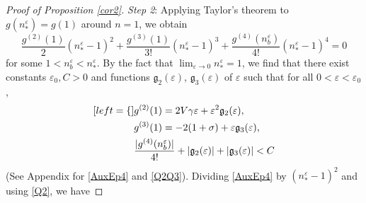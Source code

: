 \documentclass{amsart}
\newcommand{\veps}{\varepsilon}
\numberwithin{equation}{section}
\theoremstyle{plain}%
\theoremstyle{definition}
\theoremstyle{remark}
\theoremstyle{remark}
\begin{document}
\begin{proof}[Proof of Proposition \ref{cor2}]
\noindent\textit{Step 2}: 
Applying Taylor's theorem to $g(n_\ast^\veps)=g(1)$ around $n=1$, we obtain 
\begin{equation}\label{AuxEp4}
\frac{g^{(2)}(1)}{2}(n_\ast^\veps-1)^2+ \frac{g^{(3)}(1)}{3!}(n_\ast^\veps-1)^3 + \frac{g^{(4)}(n^\veps_b)}{4!}(n_\ast^\veps-1)^4 = 0
\end{equation}
for some $1<n_b^\veps<n_\ast^\veps$. By the fact that $\lim_{\veps \to 0} n_\ast^\veps=1$, we find that there exist constants $\veps_{0},C>0$ and functions $\mathfrak{g}_2(\veps)$, $\mathfrak{g}_3(\veps)$ of $\veps$ such that for all $0<\veps<\veps_0$,
\begin{subequations}\label{Q2Q3}
\begin{align}[left = \empheqlbrace\,]
& g^{(2)}(1) =  2V\gamma\veps+\veps^2 \mathfrak{g}_2(\veps), \label{Q2} \\ 
& g^{(3)}(1) = -2(1+\sigma) + \veps \mathfrak{g}_3(\veps), \label{Q3} \\
& \frac{|g^{(4)}(n_b^\veps)|}{4!} + |\mathfrak{g}_2(\veps)| + |\mathfrak{g}_3(\veps)| < C \label{Q4}
\end{align}
\end{subequations}
(See Appendix for \eqref{AuxEp4} and \eqref{Q2Q3}). Dividing \eqref{AuxEp4} by $(n_\ast^\veps-1)^2$ and using \eqref{Q2}, we have

\end{proof}
\end{document}
